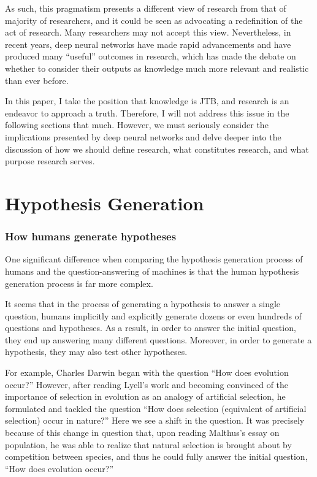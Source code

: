 \documentclass{article}
\begin{document}
As such, this pragmatism presents a different view of research from that of majority of researchers, and it could be seen as advocating a redefinition of the act of research. Many researchers may not accept this view. Nevertheless, in recent years, deep neural networks have made rapid advancements and have produced many ``useful'' outcomes in research, which has made the debate on whether to consider their outputs as knowledge much more relevant and realistic than ever before.

In this paper, I take the position that knowledge is JTB, and research is an endeavor to approach a truth. Therefore, I will not address this issue in the following sections that much. However, we must seriously consider the implications presented by deep neural networks and delve deeper into the discussion of how we should define research, what constitutes research, and what purpose research serves.

\section{Hypothesis Generation}

\subsubsection{How humans generate hypotheses}
One significant difference when comparing the hypothesis generation process of humans and the question-answering of machines is that the human hypothesis generation process is far more complex.


It seems that in the process of generating a hypothesis to answer a single question, humans implicitly and explicitly generate dozens or even hundreds of questions and hypotheses. As a result, in order to answer the initial question, they end up answering many different questions. Moreover, in order to generate a hypothesis, they may also test other hypotheses.


For example, Charles Darwin began with the question ``How does evolution occur?'' However, after reading Lyell's work and becoming convinced of the importance of selection in evolution as an analogy of artificial selection, he formulated and tackled the question ``How does selection (equivalent of artificial selection) occur in nature?'' Here we see a shift in the question. It was precisely because of this change in question that, upon reading Malthus's essay on population, he was able to realize that natural selection is brought about by competition between species, and thus he could fully answer the initial question, ``How does evolution occur?'' \cite{gribbin2022origin}
\end{document}
